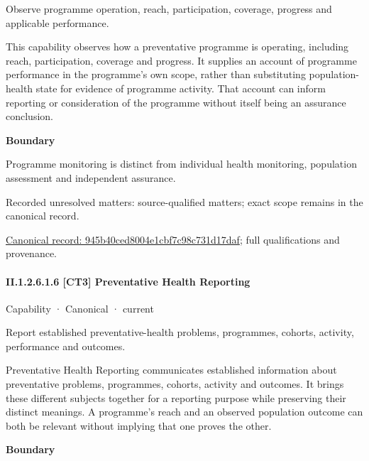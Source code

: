 Observe programme operation, reach, participation, coverage, progress and applicable performance.



This capability observes how a preventative programme is operating, including reach, participation, coverage and progress. It supplies an account of programme performance in the programme's own scope, rather than substituting population-health state for evidence of programme activity. That account can inform reporting or consideration of the programme without itself being an assurance conclusion.



\textbf{Boundary}



Programme monitoring is distinct from individual health monitoring, population assessment and independent assurance.


{\small Recorded unresolved matters: source-qualified matters; exact scope remains in the canonical record.}\par
{\footnotesize \href{../../../../continuum/strategy/capability/945b40ced8004e1cbf7c98c731d17daf.md}{Canonical record: 945b40ced8004e1cbf7c98c731d17daf}; full qualifications and provenance.}\par
\paragraph*{II.1.2.6.1.6 [CT3] Preventative Health Reporting}
\label{navigation:II.1.2.6.1.6}

\label{element:d2ef01c4cab348df822e802ab084faae}
{\small Capability · Canonical · current}\par

Report established preventative-health problems, programmes, cohorts, activity, performance and outcomes.



Preventative Health Reporting communicates established information about preventative problems, programmes, cohorts, activity and outcomes. It brings these different subjects together for a reporting purpose while preserving their distinct meanings. A programme's reach and an observed population outcome can both be relevant without implying that one proves the other.



\textbf{Boundary}



